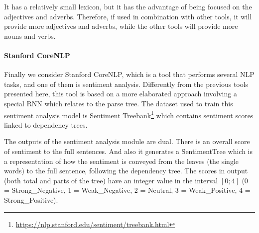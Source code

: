 It has a relatively small lexicon, but it has the advantage of being focused on the adjectives and adverbs.
Therefore, if used in combination with other tools, it will provide more adjectives and adverbs, while the other tools will provide more nouns and verbs.


\paragraph{Stanford CoreNLP}
Finally we consider Stanford CoreNLP, which is a tool that performs several NLP tasks, and one of them is sentiment analysis.
Differently from the previous tools presented here, this tool is based on a more elaborated approach involving a special RNN which relates to the parse tree. 
The dataset used to train this sentiment analysis model is Sentiment Treebank\footnote{\url{https://nlp.stanford.edu/sentiment/treebank.html}} which contains sentiment scores linked to dependency trees.

The outputs of the sentiment analysis module are dual. There is an overall score of sentiment to the full sentences. And also it generates a SentimentTree which is a representation of how the sentiment is conveyed from the leaves (the single words) to the full sentence, following the dependency tree.
The scores in output (both total and parts of the tree) have an integer value in the interval $[0;4]$ (0 = Strong\_Negative, 1 = Weak\_Negative, 2 = Neutral, 3 = Weak\_Positive, 4 = Strong\_Positive).


